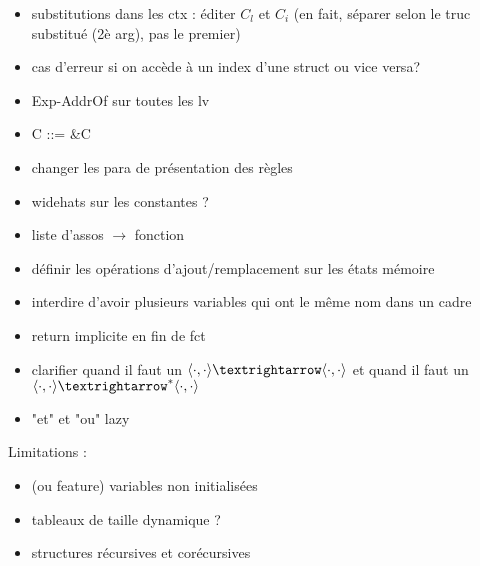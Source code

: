 \begin{itemize}
\item substitutions dans les ctx : éditer $C_l$ et $C_i$
  (en fait, séparer selon le truc substitué (2è arg), pas le premier)
\item cas d'erreur si on accède à un index d'une struct ou vice versa?
\item Exp-AddrOf sur toutes les lv
\item C ::= \&C
\item changer les para de présentation des règles
\item widehats sur les constantes ?
\item liste d'assos $→$ fonction
\item définir les opérations d'ajout/remplacement sur les états mémoire
\item interdire d'avoir plusieurs variables qui ont le même nom dans un cadre
\item return implicite en fin de fct
\item clarifier quand il faut un $\mm{\cdot}{\cdot}{\cdot}{\cdot}$
             et quand il faut un $\mmstar{\cdot}{\cdot}{\cdot}{\cdot}$
\item "et" et "ou" lazy
\end{itemize}

Limitations :

\begin{itemize}
\item (ou feature) variables non initialisées
\item tableaux de taille dynamique ?
\item structures récursives et corécursives
\end{itemize}

